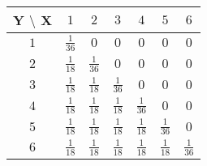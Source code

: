 \begin{center}
	\begin{tabular} {c|cccccc}
		\hline
		Y $\setminus$ X & $1$ & $2$ & $3$ & $4$ & $5$ & $6$\\
		\hline
		$1$ & $\frac{1}{36}$ & $0$ & $0$ & $0$ & $0$ & $0$\\
		$2$ & $\frac{1}{18}$ & $\frac{1}{36}$ & $0$ & $0$ & $0$ & $0$\\
		$3$ & $\frac{1}{18}$ & $\frac{1}{18}$ & $\frac{1}{36}$ & $0$ & $0$ & $0$\\
		$4$ & $\frac{1}{18}$ & $\frac{1}{18}$ & $\frac{1}{18}$ & $\frac{1}{36}$ & $0$ & $0$\\
		$5$ & $\frac{1}{18}$ & $\frac{1}{18}$ & $\frac{1}{18}$ & $\frac{1}{18}$ & $\frac{1}{36}$ & $0$\\
		$6$ & $\frac{1}{18}$ & $\frac{1}{18}$ & $\frac{1}{18}$ & $\frac{1}{18}$ & $\frac{1}{18}$ & $\frac{1}{36}$\\
	\end{tabular}
\end{center}